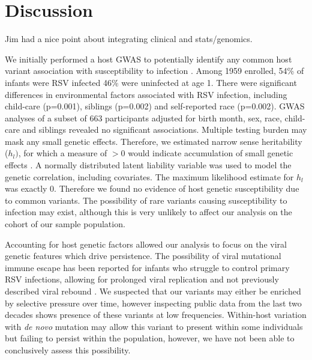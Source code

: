 \documentclass{article}
\begin{document}

\section{Discussion}

Jim had a nice point about integrating clinical and stats/genomics.

We initially performed a host GWAS to potentially identify any common host variant association with susceptibility to infection
\cite{lawless2020genome}.
Among 1959 enrolled,
 54\% of infants were RSV infected
 46\% were uninfected at age 1.
There were significant differences in environmental factors associated with RSV infection, 
including child-care (p=0.001), 
siblings (p=0.002) and 
self-reported race (p=0.002). 
GWAS analyses of a subset of 663 participants 
adjusted for birth month, sex,  race, 
child-care and  siblings
revealed no significant associations. 
Multiple testing burden may mask any small genetic effects.
Therefore, we estimated narrow sense heritability ($h_l)$, for which a measure of $>0$ would indicate accumulation of small genetic effects
\cite{golan2011accurate}.
A normally distributed latent liability variable 
was used to model the genetic correlation, 
including covariates.
The maximum likelihood estimate 
for $h_l$ was exactly 0.
Therefore we found no evidence of host genetic susceptibility due to common variants. 
The possibility of rare variants causing susceptibility to infection may exist, 
although this is very unlikely to affect our analysis on the cohort of our sample population.

Accounting for host genetic factors allowed our analysis to focus on the viral genetic features which drive 
persistence.
The possibility of viral mutational immune escape has been reported for 
infants who struggle to control primary RSV infections, allowing for prolonged viral replication and not previously described viral rebound
\cite{brint2017prolonged}.
We suspected that our variants may either be enriched by selective pressure over time, 
however inspecting public data from the last two decades shows presence of these variants at low frequencies.
Within-host variation with \textit{de novo} mutation may allow this variant to present within some individuals but failing to persist within the population, however, we have not been able to conclusively assess this possibility.
\end{document}
